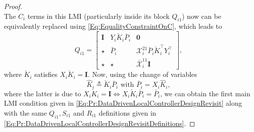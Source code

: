 \documentclass[letterpaper, 10 pt, conference]{ieeeconf}%
\newcommand{\T}{\top}
\newcommand{\I}{\mathbf{I}}
\newcommand{\0}{\mathbf{0}}
\newcommand{\X}{\mathcal{X}}
\newcommand{\x}{{\scriptstyle \X}}
\newcommand{\bm}[1]{\begin{bmatrix}#1\end{bmatrix}}
\begin{document}
\begin{proof}
$$$$
The $C_i$ terms in this LMI (particularly inside its block $Q_{i1}$) now can be equivalently replaced using \eqref{Eq:EqualityConstraintOnC}, which leads to 
$$
Q_{i1} = \bm{ 
\I & Y_i \check{K}_i \bar{P}_i & \0 \\
\star & \bar{P}_i  & \x^{21}_i \bar{P}_i \check{K}_i^\T Y_i^\T\\
\star & \star & \bar{\x}^{11}_i\I 
},
$$
where $\check{K}_i$ satisfies $X_i \check{K}_i = \I$. Now, using the change of variables
$$
\hat{K}_i \triangleq \check{K}_i \bar{P}_i \mbox{ with } \bar{P}_i = X_i \hat{K}_i,
$$
where the latter is due to $X_i \check{K}_i = \I \iff X_i \check{K}_i \bar{P}_i = \bar{P}_i$, we can obtain the first main LMI condition given in \eqref{Eq:Pr:DataDrivenLocalControllerDesignRevisit} along with the same $Q_{i1}, S_{i1}$ and $R_{i1}$ definitions given in \eqref{Eq:Pr:DataDrivenLocalControllerDesignRevisitDefinitions}.  


\end{proof}
\end{document}
